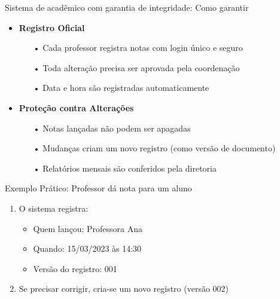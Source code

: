 \begin{frame}{Sistema de acadêmico com garantia de integridade: Como garantir}

  \begin{itemize}
    \item \textbf{Registro Oficial}
          \begin{itemize}
            \item[•] Cada professor registra notas com login único e seguro
            \item[•] Toda alteração precisa ser aprovada pela coordenação
            \item[•] Data e hora são registradas automaticamente
          \end{itemize}

    \item \textbf{Proteção contra Alterações}
          \begin{itemize}
            \item[•] Notas lançadas não podem ser apagadas
            \item[•] Mudanças criam um novo registro (como versão de documento)
            \item[•] Relatórios mensais são conferidos pela diretoria
          \end{itemize}
  \end{itemize}


  \begin{exampleblock}{Exemplo Prático: Professor dá nota para um aluno}
    \begin{enumerate}
      \item O sistema registra:
            \begin{itemize}
              \item Quem lançou: Professora Ana
              \item Quando: 15/03/2023 às 14:30
              \item Versão do registro: 001
            \end{itemize}
      \item Se precisar corrigir, cria-se um novo registro (versão 002)
    \end{enumerate}
  \end{exampleblock}
\end{frame}

